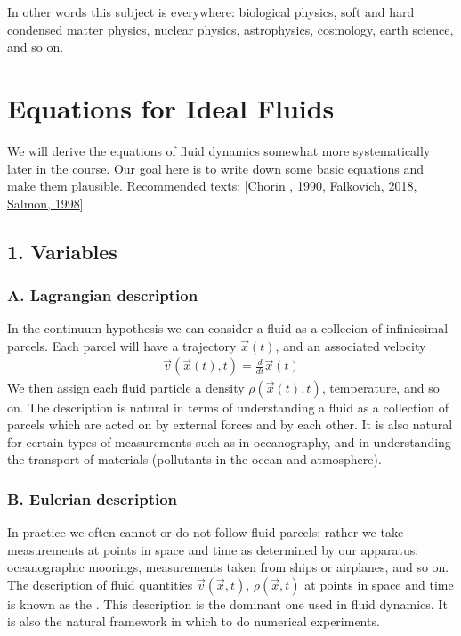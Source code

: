 \documentclass[letterpaper,10pt,english]{jupyterBook}
\begin{document}
\sphinxAtStartPar
In other words this subject is everywhere: biological physics, soft and
hard condensed matter physics, nuclear physics, astrophysics, cosmology,
earth science, and so on.


\section{Equations for Ideal Fluids}
\label{\detokenize{chapter1/euler:equations-for-ideal-fluids}}\label{\detokenize{chapter1/euler::doc}}
\sphinxAtStartPar
We will derive the equations of fluid dynamics somewhat more systematically
later in the course. Our goal here is to write down some basic equations
and make them plausible. Recommended texts: {[}\hyperlink{cite.bibliography:id4}{Chorin , 1990}, \hyperlink{cite.bibliography:id5}{Falkovich, 2018}, \hyperlink{cite.bibliography:id6}{Salmon, 1998}{]}.


\subsection{1. Variables}
\label{\detokenize{chapter1/euler:variables}}

\subsubsection{A. Lagrangian description}
\label{\detokenize{chapter1/euler:a-lagrangian-description}}
\sphinxAtStartPar
In the continuum hypothesis we can consider a fluid as a collecion of
infiniesimal parcels. Each parcel will have a trajectory \({\vec x}(t)\),
and an associated velocity
\begin{equation}\label{equation:chapter1/euler:lag_vel}
\begin{split}{\vec v}({\vec x}(t),t) = \frac{d}{dt} {\vec x}(t)\end{split}
\end{equation}
\sphinxAtStartPar
We then assign each fluid particle a density \(\rho({\vec x}(t), t)\),
temperature, and so on. The description is natural in terms of understanding
a fluid as a collection of parcels which are acted on by external forces
and by each other. It is also natural for certain types of measurements
such as  in oceanography, and in
understanding the transport of materials (pollutants in the ocean and
atmosphere).


\subsubsection{B. Eulerian description}
\label{\detokenize{chapter1/euler:b-eulerian-description}}
\sphinxAtStartPar
In practice we often cannot or do not follow fluid parcels; rather we take
measurements at points in space and time as determined by our apparatus:
oceanographic moorings, measurements taken from ships or airplanes, and so on.
The description of fluid quantities \({\vec v}({\vec x},t)\), \(\rho({\vec x}, t)\)
at points in space and time is known as the .
This description is the dominant one used in fluid dynamics. It is
also the natural framework in which to do numerical experiments.
\end{document}
